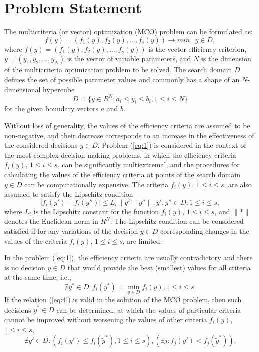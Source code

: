 \documentclass[smallextended]{svjour3}       %
\begin{document}
\section{Problem Statement}
\label{sec:2}

The multicriteria (or vector) optimization (MCO) problem can be formulated as:
\begin{equation}\label{eq:1}
f(y) = (f_1(y), f_2(y), \dots , f_s(y)) \to min, \; y \in D,
\end{equation}
where $f(y) = (f_1(y),f_2(y),\dots,f_s(y))$  is the vector efficiency criterion, $y = (y_1,y_2,\dots,y_N)$ is the vector of variable parameters, and $N$ is the dimension of the multicriteria optimization problem to be solved. The search domain $D$ defines the set of possible parameter values and commonly has a shape of an $N$-dimensional hypercube
\begin{equation}\label{eq:2}
D  = \{ y\in R^N: a_i \leq y_i \leq b_i, 1 \leq i \leq N \}
\end{equation}
for the given boundary vectors $a$ and $b$.

Without loss of generality, the values of the efficiency criteria are assumed to be non-negative, and their decrease corresponds to an increase in the effectiveness of the considered decisions $y \in D$. Problem (\ref{eq:1}) is considered in the context of the most complex decision-making problems, in which the efficiency criteria $f_i(y)$, $1 \leq i \leq s$, can be significantly multiextremal, and the procedures for calculating the values of the efficiency criteria at points of the search domain $y \in D$ can be computationally expensive. The criteria $f_i (y)$, $1 \leq i \leq s$, are also assumed to satisfy the Lipschitz condition
\begin{equation}\label{eq:3}
|f_i (y')-f_i (y'')| \leq L_i \|y'-y''\|, y',y''\in D, 1 \leq i \leq s,
\end{equation}
where $L_i$ is the Lipschitz constant for the function $f_i(y)$, $1 \leq i \leq s$, and ${\|*\|}$ denotes the Euclidean norm in $R^N$. The Lipschitz condition can be considered satisfied if for any variations of the decision $y \in D$ corresponding changes in the values of the criteria $f_i(y)$, $1 \leq i \leq s$, are limited.

In the problem (\ref{eq:1}), the efficiency criteria are usually contradictory and there is no decision $y \in D$ that would provide the best (smallest) values for all criteria at the same time, i.e.,
\begin{equation}\label{eq:4}
\nexists y^*\in D: f_i(y^*) = \min_{y \in D} {f_i (y)} , 1 \leq i \leq s.
\end{equation}
If the relation (\ref{eq:4}) is valid in the solution of the MCO problem, then such decisions $\widetilde{y}^* \in D$ can be determined, at which the values of particular criteria cannot be improved without worsening the values of other criteria $f_i(y)$, $1 \leq i \leq s$,
\begin{equation}\label{eq:5}
\nexists y'\in D: (f_i(y') \leq f_i(\widetilde{y}^*), 1 \leq i \leq s), (\exists j: f_j(y') < f_j(\widetilde{y}^*)).
\end{equation}
\end{document}
